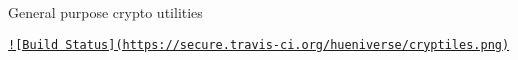 General purpose crypto utilities

\href{http://travis-ci.org/hueniverse/cryptiles}{\tt !\mbox{[}Build Status\mbox{]}(https\+://secure.\+travis-\/ci.\+org/hueniverse/cryptiles.\+png)} 